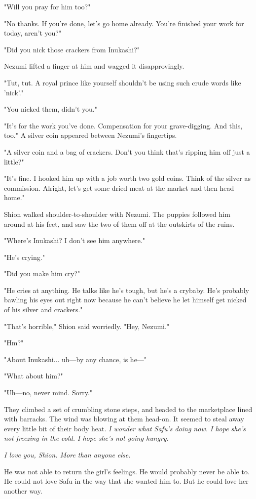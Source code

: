 "Will you pray for him too?"

"No thanks. If you're done, let's go home already. You're finished your
work for today, aren't you?"

"Did you nick those crackers from Inukashi?"

Nezumi lifted a finger at him and wagged it disapprovingly.

"Tut, tut. A royal prince like yourself shouldn't be using such crude
words like 'nick'."

"You nicked them, didn't you."

"It's for the work you've done. Compensation for your grave-digging. And
this, too." A silver coin appeared between Nezumi's fingertips.

"A silver coin and a bag of crackers. Don't you think that's ripping him
off just a little?"

"It's fine. I hooked him up with a job worth two gold coins. Think of
the silver as commission. Alright, let's get some dried meat at the
market and then head home."

Shion walked shoulder-to-shoulder with Nezumi. The puppies followed him
around at his feet, and saw the two of them off at the outskirts of the
ruins.

"Where's Inukashi? I don't see him anywhere."

"He's crying."

"Did you make him cry?"

"He cries at anything. He talks like he's tough, but he's a crybaby.
He's probably bawling his eyes out right now because he can't believe he
let himself get nicked of his silver and crackers."

"That's horrible," Shion said worriedly. "Hey, Nezumi."

"Hm?"

"About Inukashi... uh---by any chance, is he---"

"What about him?"

"Uh---no, never mind. Sorry."

They climbed a set of crumbling stone steps, and headed to the
marketplace lined with barracks. The wind was blowing at them head-on.
It seemed to steal away every little bit of their body heat. \emph{I wonder
what Safu's doing now. I hope she's not freezing in the cold. I hope
she's not going hungry.}

\emph{I love you, Shion. More than anyone else.}

He was not able to return the girl's feelings. He would probably never
be able to. He could not love Safu in the way that she wanted him to.
But he could love her another way.


